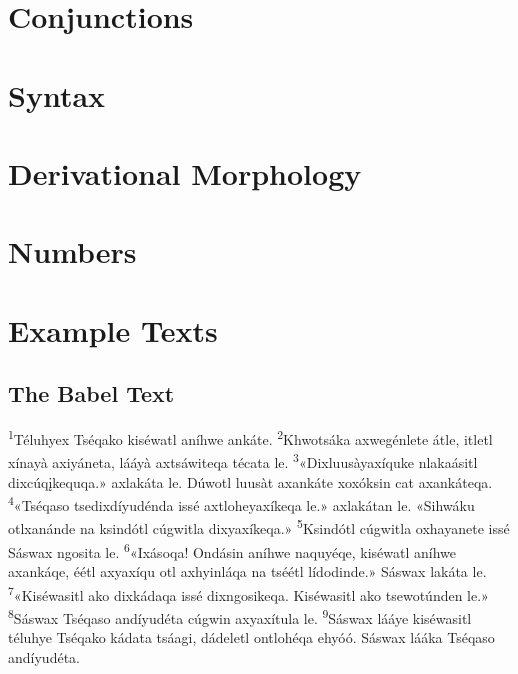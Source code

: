 \documentclass[11pt,a4paper,titlepage]{article}
\begin{document}
	\section{Conjunctions}
		\lipsum[1]
	\section{Syntax}
		\lipsum[1]
	\section{Derivational Morphology}
		\lipsum[1]
	\section{Numbers}
		\lipsum[1]
	\section{Example Texts}
		\subsection{The Babel Text}
			\textsuperscript{1}Téluhyex Tséqako kiséwatl aníhwe ankáte.
			\textsuperscript{2}Khwotsáka axwegénlete \'atle, itletl xínay\`a axiy\'aneta, lááy\`a axtsáwiteqa técata le.
			\textsuperscript{3}«Dixluusàyaxíquke nlakaásitl dixcúqįkequqa.» axlakáta le. Dúwotl luusàt axankáte xoxóksin cat axankáteqa.
			\textsuperscript{4}«Tséqaso tsedixdíyudénda issé axtloheyaxíkeqa le.» axlakátan le. «Sihwáku otlxanánde na ksindótl cúgwitla dixyaxíkeqa.»
			\textsuperscript{5}Ksindótl cúgwitla oxhayanete issé Sáswax ngosita le.
			\textsuperscript{6}«Ixásoqa! Ondásin aníhwe naquyéqe, kiséwatl aníhwe axankáqe, éétl axyaxíqu otl axhyinláqa na tséétl lídodinde.» Sáswax lakáta le.
			\textsuperscript{7}«Kiséwasitl ako dixkádaqa issé dixngosikeqa. Kiséwasitl ako tsewotúnden le.»
			\textsuperscript{8}Sáswax Tséqaso andíyudéta cúgwin axyaxítula le.
			\textsuperscript{9}Sáswax lááye kiséwasitl téluhye Tséqako kádata tsáagi, dádeletl ontlohéqa ehyóó. Sáswax lááka Tséqaso andíyudéta.
			\\~


			\vspace{12pt}

			\vspace{12pt}

			\vspace{12pt}
\end{document}
